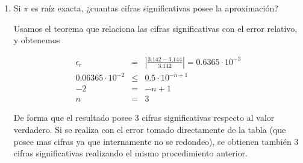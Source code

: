 \documentclass[12pt]{article}
\begin{document}
\begin{enumerate}[leftmargin=*,widest=9]
\begin{enumerate}[label=\alph*]
    \item Si $\pi$ es raíz exacta, ¿cuantas cifras significativas posee la aproximación?
    
    Usamos el teorema que relaciona las cifras significativas con el error relativo, y obtenemos
    
    \begin{eqnarray*}
    \epsilon_r  & = & \left| \frac{3.142 - 3.144}{3.142} \right| = 0.6365\cdot 10^{-3}  \\
    0.06365\cdot 10^{-2} & \leq & 0.5 \cdot 10^{-n + 1} \\
    -2 & = & -n + 1 \\
    n & = & 3
    \end{eqnarray*}
    
    De forma que el resultado posee 3 cifras significativas respecto al valor verdadero. Si se realiza con el error tomado directamente de la tabla (que posee mas cifras ya que internamente no se redondeo), se obtienen también 3 cifras significativas realizando el mismo procedimiento anterior.
    
    \end{enumerate}

    
  \end{enumerate}
  
\end{document}
